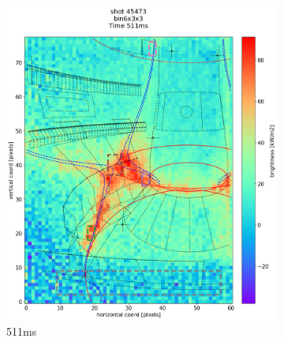 \begin{figure}
\begin{subfigure}{0.355\linewidth}
         \includegraphics[trim={50 45 25 80},clip,width=\textwidth]{Chapters/chapter2/figs/IRVB-MASTU_shot-45473_export_35.png}
         \vspace*{-6.5mm}
         \caption{511ms}
         \label{fig:45473_export_2}
     \end{subfigure}
     \begin{subfigure}{0.355\linewidth}
         \centering

\end{subfigure}
\end{figure}
